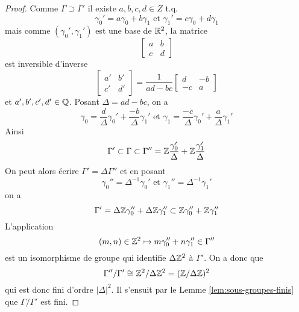 \begin{proof}
	Comme $\Gamma \supset \Gamma'$ il existe $a, b, c, d \in Z$ t.q.
	\begin{equation*}
		\gamma_0' = a \gamma_0 + b \gamma_1\textrm{ et }
		\gamma_1' = c \gamma_0 + d \gamma_1
	\end{equation*}
	mais comme $(\gamma_0', \gamma_1')$ est une base de $\mathbb{R}^2$, la matrice
	\begin{equation*}
		\begin{bmatrix}
			a & b \\
			c & d
		\end{bmatrix}
	\end{equation*}
	est inversible d'inverse
	\begin{equation*}
		\begin{bmatrix}
			a' & b' \\
			c' & d'
		\end{bmatrix}
		= \frac{1}{ad - bc}
		\begin{bmatrix}
			d & -b \\
			-c & a
		\end{bmatrix}
	\end{equation*}
	et $a', b', c', d' \in \mathbb{Q}$. Posant $\Delta = ad - bc$, on a
	\begin{equation*}
		\gamma_0 = \frac{d}{\Delta}\gamma_0' + \frac{-b}{\Delta}\gamma_1'\textrm{ et }
		\gamma_1 = \frac{-c}{\Delta}\gamma_0' + \frac{a}{\Delta}\gamma_1'
	\end{equation*}
	Ainsi
	\begin{equation*}
		\Gamma' \subset \Gamma \subset \Gamma'' =
		\mathbb{Z} \frac{\gamma_0'}{\Delta} + \mathbb{Z} \frac{\gamma_1'}{\Delta}
	\end{equation*}
	On peut alors écrire $\Gamma' = \Delta\Gamma''$ et en posant
	\begin{equation*}
		\gamma_0'' = \Delta^{-1} \gamma_0' \textrm{ et }
		\gamma_1'' = \Delta^{-1} \gamma_1'
	\end{equation*}
	on a
	\begin{equation*}
		\Gamma' = \Delta\mathbb{Z}\gamma_0'' + \Delta\mathbb{Z}\gamma_1'' \subset
		\mathbb{Z}\gamma_0'' + \mathbb{Z}\gamma_1''
	\end{equation*}
	L'application
	\begin{equation*}
		(m, n) \in \mathbb{Z}^2 \mapsto m \gamma_0'' + n\gamma_1'' \in \Gamma''
	\end{equation*}
	est un isomorphisme de groupe qui identifie $\Delta\mathbb{Z}^2$ à $\Gamma'$. On a
	donc que 
	\begin{equation*}
		\Gamma''/\Gamma' \cong \mathbb{Z}^2/\Delta\mathbb{Z}^2 = (\mathbb{Z}/\Delta\mathbb{Z})^2
	\end{equation*}
	qui est donc fini d'ordre $|\Delta|^2$. Il s'ensuit par le Lemme
	\ref{lem:sous-groupes-finis} que $\Gamma/\Gamma'$ est fini.
\end{proof}
